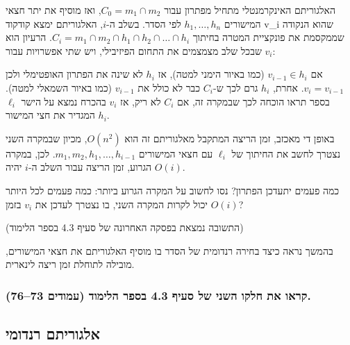 \documentclass[
]{book}
\begin{document}
האלגוריתם האינקרמנטלי מתחיל מפתרון עבור \(C_0 = m_1 \cap m_2\), ואז מוסיף את יתר חצאי המישורים \(h_1, \dots, h_n\) לפי הסדר. בשלב ה-\(i\), האלגוריתם ימצא קודקוד v\_i שהוא הנקודה שממקסמת את פונקציית המטרה בחיתוך \(C_i = m_1 \cap m_2 \cap h_1 \cap h_2 \cap \dots \cap h_i\). הרעיון הוא שבכל שלב מצמצמים את התחום הפיזיבילי, ויש שתי אפשרויות עבור \(v_i\):

אם \(v_{i-1}\in h_i\) (כמו באיור הימני למטה), אז \(h_i\) לא שינה את הפתרון האופטימלי ולכן \(v_i = v_{i-1}\). אחרת, \(h_i\) גרם לכך ש-\(C_i\) כבר לא כולל את \(v_{i-1}\) (כמו באיור השמאלי למטה). בספר תראו הוכחה לכך שבמקרה זה, אם \(C_i\) לא ריק, אז \(v_i\) בהכרח נמצא על הישר \(\ell_i\) המגדיר את חצי המישור \(h_i\).

באופן די מאכזב, זמן הריצה המתקבל מאלגוריתם זה הוא \(O(n^2)\), מכיון שבמקרה השני נצטרך לחשב את החיתוך של \(\ell_i\) עם חצאי המישורים \(m_1, m_2, h_1, \dots, h_{i-1}\). לכן, במקרה הגרוע, זמן הריצה עבור השלב ה-\(i\) יהיה \(O(i)\).

כמה פעמים יתעדכן הפתרון? נסו לחשוב על המקרה הגרוע ביותר: כמה פעמים לכל היותר יכול לקרות המקרה השני, בו נצטרך לעדכן את \(v_i\) בזמן \(O(i)\)?

(התשובה נמצאת בפסקה האחרונה של סעיף 4.3 בספר הלימוד)

בהמשך נראה כיצד בחירה רנדומית של הסדר בו מוסיף האלגוריתם את חצאי המישורים, מובילה לתוחלת זמן ריצה לינארית.

\hypertarget{ux5e7ux5e8ux5d0ux5d5-ux5d0ux5ea-ux5d7ux5dcux5e7ux5d5-ux5d4ux5e9ux5e0ux5d9-ux5e9ux5dc-ux5e1ux5e2ux5d9ux5e3-4.3-ux5d1ux5e1ux5e4ux5e8-ux5d4ux5dcux5d9ux5deux5d5ux5d3-ux5e2ux5deux5d5ux5d3ux5d9ux5dd-7376.}{%
\subsubsection*{קראו את חלקו השני של סעיף 4.3 בספר הלימוד (עמודים 73--76).}\label{ux5e7ux5e8ux5d0ux5d5-ux5d0ux5ea-ux5d7ux5dcux5e7ux5d5-ux5d4ux5e9ux5e0ux5d9-ux5e9ux5dc-ux5e1ux5e2ux5d9ux5e3-4.3-ux5d1ux5e1ux5e4ux5e8-ux5d4ux5dcux5d9ux5deux5d5ux5d3-ux5e2ux5deux5d5ux5d3ux5d9ux5dd-7376.}}

\hypertarget{ux5d0ux5dcux5d2ux5d5ux5e8ux5d9ux5eaux5dd-ux5e8ux5e0ux5d3ux5d5ux5deux5d9}{%
\subsection{אלגוריתם רנדומי}\label{ux5d0ux5dcux5d2ux5d5ux5e8ux5d9ux5eaux5dd-ux5e8ux5e0ux5d3ux5d5ux5deux5d9}}
\end{document}
